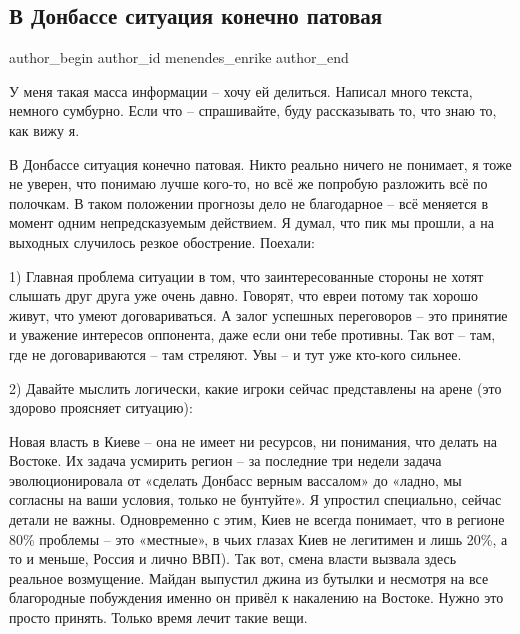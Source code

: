  
 
 
 
 
 
\subsection{В Донбассе ситуация конечно патовая}
\label{sec:14_04_2014.fb.menendes_enrike.1.donbass_situacia_patovaja}
 
\ifcmt
 author_begin
   author_id menendes_enrike
 author_end
\fi

У меня такая масса информации – хочу ей делиться. Написал много текста, немного
сумбурно. Если что – спрашивайте, буду рассказывать то, что знаю то, как вижу
я. 

В Донбассе ситуация конечно патовая. Никто реально ничего не понимает, я тоже
не уверен, что понимаю лучше кого-то, но всё же попробую разложить всё по
полочкам. В таком положении  прогнозы дело не благодарное – всё меняется в
момент одним непредсказуемым действием. Я думал, что пик мы прошли, а на
выходных случилось резкое обострение. Поехали:

1) Главная проблема ситуации в том, что заинтересованные стороны не хотят
слышать друг друга уже очень давно. Говорят, что евреи потому так хорошо живут,
что умеют договариваться. А залог успешных переговоров – это принятие и
уважение интересов оппонента, даже если они тебе противны. Так вот – там, где
не договариваются – там стреляют. Увы – и тут уже кто-кого сильнее.

2) Давайте мыслить логически, какие игроки сейчас представлены на арене (это
здорово проясняет ситуацию):

Новая власть в Киеве – она не имеет ни ресурсов, ни понимания, что делать на
Востоке. Их задача усмирить регион – за последние три недели задача
эволюционировала от «сделать Донбасс верным вассалом» до «ладно, мы согласны на
ваши условия, только не бунтуйте». Я упростил специально, сейчас детали не
важны. Одновременно с этим, Киев не всегда понимает, что в регионе 80\% проблемы
– это «местные», в чьих глазах Киев не легитимен и лишь 20\%, а то и меньше,
Россия и лично ВВП).  Так вот, смена власти вызвала здесь реальное возмущение.
Майдан выпустил джина из бутылки и несмотря на все благородные побуждения
именно он привёл к накалению на Востоке. Нужно это просто принять. Только время
лечит такие вещи.

